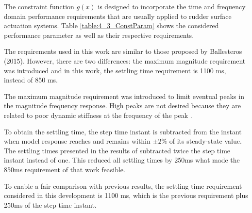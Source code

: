 The constraint function $g(x)$ is designed to incorporate the time and frequency domain performance requirements that are usually applied to rudder surface actuation systems. Table \ref{table:4_3_ConstParam} shows the considered performance parameter as well as their respective requirements.

\begin{table}[H]
	\label{table:4_3_ConstParam}
	\centering
\end{table}

The requirements used in this work are similar to those proposed by Ballesteros (2015). However, there are two differences: the maximum magnitude requirement was introduced and in this work, the settling time requirement is 1100 ms, instead of 850 ms.

The maximum magnitude requirement was introduced to limit eventual peaks in the magnitude frequency response. High peaks are not desired because they are related to poor dynamic stiffness at the frequency of the peak \cite{Ballesteros}.

To obtain the settling time, the step time instant is subtracted from the instant when model response reaches and remains within $\pm2\%$ of its steady-state value. The settling times presented in the results of  subtracted twice the step time instant instead of one. This reduced all settling times by 250ms what made the 850ms requirement of that work feasible. 

To enable a fair comparison with previous results, the settling time requirement considered in this development is 1100 ms, which is the previous requirement plus 250ms of the step time instant.

